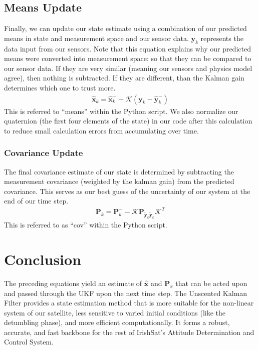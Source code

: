 \documentclass{article}
\newcommand{\x}{\mathbf{x}}
\newcommand{\Cov}{\mathbf{P}}
\newcommand{\y}{\mathbf{y}}
\begin{document}
\subsection{Means Update}
Finally, we can update our state estimate using a combination of our predicted means in state and measurement space and our sensor data. $\y_k$ represents the data input from our sensors.
Note that this equation explains why our predicted means were converted into measurement space: so that they can be compared to our sensor data. If they are very similar (meaning our sensors and physics model agree), then nothing is subtracted. If they are different, than the Kalman gain determines which one to trust more. 
 \begin{align}
    \hat{\x}_k = \hat{\x}_k^{-} - \mathcal{K} (\y_k - \hat{\y}_k^{-} ) \label{eq:finalMeans}
\end{align}
This is referred to ``means'' within the Python script. We also normalize our quaternion (the first four elements of the state) in our code after this calculation to reduce small calculation errors from accumulating over time. 

\subsubsection{Covariance Update}
The final covariance estimate of our state is determined by subtracting the measurement covariance (weighted by the kalman gain) from the predicted covariance. This serves as our best guess of the uncertainty of our system at the end of our time step.
\begin{align}
    \Cov_k = \Cov_k^{-} - \mathcal{K} \Cov_{\tilde{\y}_k\tilde{\y}_k} \mathcal{K}^{T} \label{eq:finalCov}
\end{align}
This is referred to as ``cov'' within the Python script.

\section{Conclusion}
The preceding equations yield an estimate of $\hat{\x}$ and $\Cov_x$ that can be acted upon and passed through the UKF upon the next time step. The Unscented Kalman Filter provides a state estimation method that is more suitable for the non-linear system of our satellite, less sensitive to varied initial conditions (like the detumbling phase), and more efficient computationally. It forms a robust, accurate, and fast backbone for the rest of IrishSat's Attitude Determination and Control System. 

\nocite{*}
 
\end{document}
